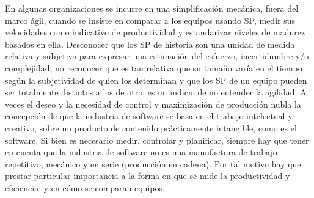 \begin{enumerate}
En algunas organizaciones se incurre en una simplificación mecánica, fuera del marco ágil, cuando se insiste en comparar a los equipos usando SP, medir sus velocidades como indicativo de productividad y estandarizar niveles de madurez basados en ella. 
Desconocer que los SP de historia son una unidad de medida relativa y subjetiva para expresar una estimación del esfuerzo, incertidumbre y/o complejidad, no reconocer que es tan relativa que su tamaño varía en el tiempo según la subjetividad de quien los determinan y que los SP de un equipo pueden ser totalmente distintos a los de otro; es un indicio de no entender la agilidad. A veces el deseo y la necesidad de control y maximización de producción nubla la concepción de que la industria de software se basa en el trabajo intelectual y creativo, sobre un producto de contenido prácticamente intangible, como es el software. Si bien es necesario medir, controlar y planificar, siempre hay que tener en cuenta que la industria de software no es una manufactura de trabajo repetitivo, mecánico y en serie (producción en cadena). Por tal motivo hay que prestar particular importancia a la forma en que se mide la productividad y eficiencia; y en cómo se comparan equipos.


\end{enumerate}
